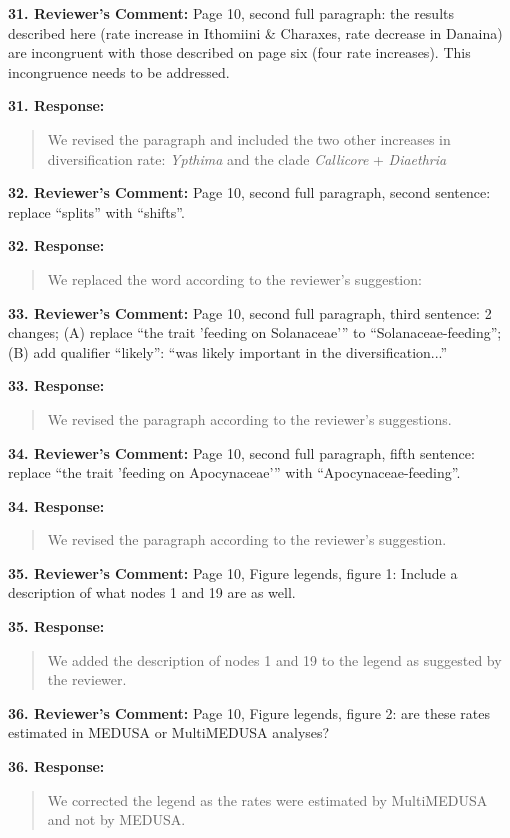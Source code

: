 \documentclass[]{article}
\begin{document}
\textbf{31. Reviewer's Comment:}
Page 10, second full paragraph: the results described here (rate increase in 
Ithomiini \& Charaxes, rate decrease in Danaina) are incongruent with those
described on page six (four rate increases). This incongruence needs to be 
addressed.

\textbf{31. Response:}
\begin{quote}
\color{blue}
We revised the paragraph and included the two other increases
in diversification rate: \emph{Ypthima} and the clade \emph{Callicore} + 
\emph{Diaethria}
\end{quote}


\textbf{32. Reviewer's Comment:}
Page 10, second full paragraph, second sentence: replace “splits” with “shifts”.

\textbf{32. Response:}
\begin{quote}
\color{blue}
We replaced the word according to the reviewer's suggestion:
\end{quote}


\textbf{33. Reviewer's Comment:}
Page 10, second full paragraph, third sentence: 2 changes; (A) replace “the
trait 'feeding on Solanaceae'” to “Solanaceae-feeding”; (B) add qualifier
“likely”: “was likely important in the diversification...”

\textbf{33. Response:}
\begin{quote}
\color{blue}
We revised the paragraph according to the reviewer's suggestions.
\end{quote}


\textbf{34. Reviewer's Comment:}
Page 10, second full paragraph, fifth sentence: replace “the trait 'feeding on
Apocynaceae'” with “Apocynaceae-feeding”.

\textbf{34. Response:}
\begin{quote}
\color{blue}
We revised the paragraph according to the reviewer's suggestion.
\end{quote}


\textbf{35. Reviewer's Comment:}
Page 10, Figure legends, figure 1: Include a description of what nodes 1 and
19 are as well.

\textbf{35. Response:}
\begin{quote}
\color{blue}
We added the description of nodes 1 and 19 to the legend as suggested by the
reviewer.
\end{quote}


\textbf{36. Reviewer's Comment:}
Page 10, Figure legends, figure 2: are these rates estimated in MEDUSA or MultiMEDUSA analyses?

\textbf{36. Response:}
\begin{quote}
\color{blue}
We corrected the legend as the rates were estimated by MultiMEDUSA and not by
MEDUSA.
\end{quote}
\end{document}
